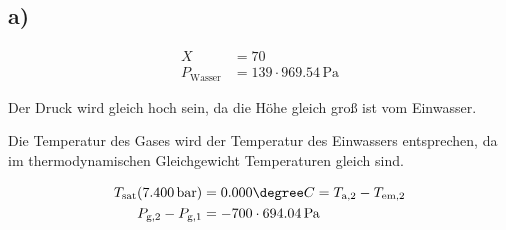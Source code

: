

\subsection*{a)}

\begin{align*}
X & = 70 \\
P_{\text{Wasser}} & = 139 \cdot 969.54 \, \text{Pa}
\end{align*}

Der Druck wird gleich hoch sein, da die Höhe gleich groß ist vom Einwasser.

Die Temperatur des Gases wird der Temperatur des Einwassers entsprechen, da im thermodynamischen Gleichgewicht Temperaturen gleich sind.

\begin{align*}
T_{\text{sat}} (7.400 \, \text{bar}) & = 0.000 \degree C = T_{\text{a,2}} - T_{\text{em,2}} \\
P_{\text{g,2}} - P_{\text{g,1}} & = -700 \cdot 694.04 \, \text{Pa}
\end{align*}